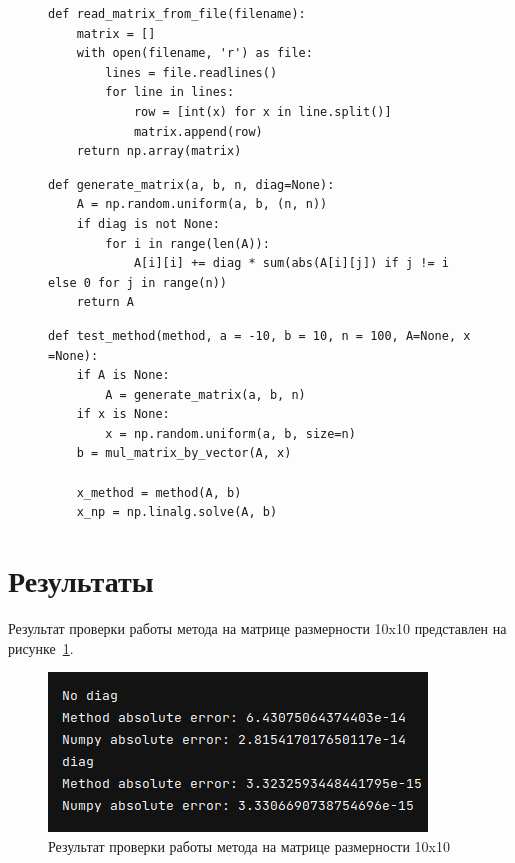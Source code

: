 \documentclass[a4paper, 14pt]{extarticle}
\begin{document}
\begin{figure}[H]
\begin{lstlisting}[language={},caption={Чтение матрицы из файла},label={lst:code2}]
def read_matrix_from_file(filename):
    matrix = []
    with open(filename, 'r') as file:
        lines = file.readlines()
        for line in lines:
            row = [int(x) for x in line.split()]
            matrix.append(row)
    return np.array(matrix)
\end{lstlisting}
\end{figure}

\begin{figure}[H]
\begin{lstlisting}[language={},caption={Генерация матрицы},label={lst:code3}]
def generate_matrix(a, b, n, diag=None):
    A = np.random.uniform(a, b, (n, n))
    if diag is not None:
        for i in range(len(A)):
            A[i][i] += diag * sum(abs(A[i][j]) if j != i else 0 for j in range(n))
    return A
\end{lstlisting}
\end{figure}

\begin{figure}[H]
\begin{lstlisting}[language={},caption={Тестирование},label={lst:code4}]
def test_method(method, a = -10, b = 10, n = 100, A=None, x =None):
    if A is None:
        A = generate_matrix(a, b, n)
    if x is None:
        x = np.random.uniform(a, b, size=n)
    b = mul_matrix_by_vector(A, x)

    x_method = method(A, b)
    x_np = np.linalg.solve(A, b)
\end{lstlisting}
\end{figure}

\section{Результаты}

Результат проверки работы метода на матрице размерности 10x10 представлен на рисунке~\ref{fig:img1}.

\begin{figure}[H]
\centering
\includegraphics{images/res1.png}
\caption{Результат проверки работы метода на матрице размерности 10x10}
\label{fig:img1}
\end{figure}
\end{document}
